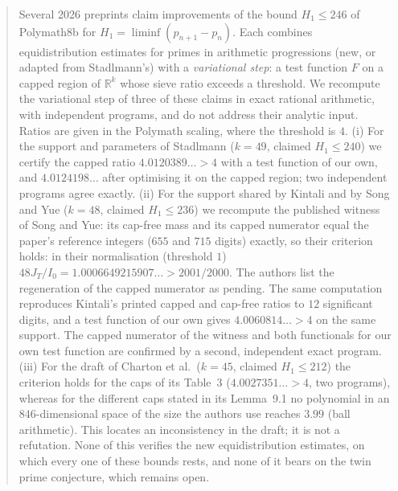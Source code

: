 

\begin{abstract}
Several 2026 preprints claim improvements of the bound $H_1\le246$ of
Polymath8b for $H_1=\liminf(p_{n+1}-p_n)$. Each combines equidistribution
estimates for primes in arithmetic progressions (new, or adapted from
Stadlmann's) with a \emph{variational step}:
a test function $F$ on a capped region of $\mathbb R^k$ whose sieve ratio
exceeds a threshold. We recompute the variational step of three of these
claims in exact rational arithmetic, with independent programs, and do not
address their analytic input. Ratios are given in the Polymath scaling, where
the threshold is $4$. (i) For the support and parameters of Stadlmann
($k=49$, claimed $H_1\le240$) we certify the capped ratio $4.0120389\ldots>4$
with a test function of our own, and $4.0124198\ldots$ after optimising it on
the capped region; two independent programs agree exactly.
(ii) For the support shared by Kintali and by Song and Yue ($k=48$, claimed
$H_1\le236$) we recompute the published witness of Song and Yue: its cap-free
mass and its capped numerator equal the paper's reference integers ($655$ and
$715$ digits) exactly, so their criterion holds: in their normalisation (threshold
$1$) $48J_T/I_0=1.0006649215907\ldots>2001/2000$. The authors list the regeneration of the
capped numerator as pending. The same computation reproduces Kintali's
printed capped and cap-free ratios to $12$ significant digits, and a test
function of our own gives $4.0060814\ldots>4$ on the same support. The capped
numerator of the witness and both functionals for our own test function are
confirmed by a second, independent exact program.
(iii) For the draft of Charton et al.\ ($k=45$, claimed $H_1\le212$) the
criterion holds for the caps of its Table~3 ($4.0027351\ldots>4$, two
programs), whereas for the different caps stated in its Lemma~9.1 no
polynomial in an $846$-dimensional space of the size the authors use reaches
$3.99$ (ball arithmetic). This locates an inconsistency in the draft; it is
not a refutation. None of this verifies the new equidistribution estimates,
on which every one of these bounds rests, and none of it bears on the twin
prime conjecture, which remains open.
\end{abstract}

\maketitle

